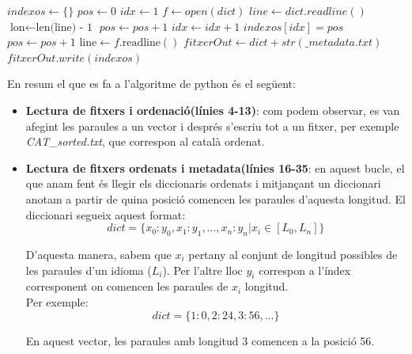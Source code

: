 \documentclass[conference]{IEEEtran}
\begin{document}
\begin{itemize}
\begin{algorithm}
\begin{algorithmic}[1]
                        \State $indexos \gets \{ \}$
                        \State $pos\gets  0$
                        \State $idx \gets 1$
                        \State $f \gets open(dict)$
                        \State $line \gets dict.readline()$
                            \State $\text{lon} \gets \text{len(line) - 1}$
                                \State $pos \gets pos+1$
                            \Else
                                \State $idx \gets idx+1$
                                \State $indexos[idx]=pos$
                                \State $pos \gets pos+1$
                            \EndIf
                            \State $\text{line} \gets f.\text{readline}()$
                        \EndWhile
                        \State $fitxerOut \gets dict+str(\_metadata.txt)$
                        \State $fitxerOut.write(indexos)$
                    \EndFor
                    \end{algorithmic}
                \end{algorithm}

            En resum el que es fa a l'algoritme de python és el següent:

            \begin{itemize}
                \item \textbf{Lectura de fitxers i ordenació(línies 4-13)}: com podem observar, es van afegint les paraules a un vector i després s'escriu tot a un fitxer, per exemple \textit{CAT\_sorted.txt}, que correspon al català ordenat.\\
                \item \textbf{Lectura de fitxers ordenats i metadata(línies 16-35}: en aquest bucle, el que anam fent és llegir els diccionaris ordenats i mitjançant un diccionari anotam a partir de quina posició comencen les paraules d'aquesta longitud. El diccionari segueix aquest format:
                $$dict=\{x_{0}:y_{0},x_{1}:y_{1},...,x_{n}:y_{n}|x_i \in [L_0,L_n]\}$$

                D'aquesta manera, sabem que $x_i$ pertany al conjunt de longitud possibles de les paraules d'un idioma ($L_i$). Per l'altre lloc $y_i$ correspon a l'índex corresponent on comencen les paraules de $x_i$ longitud.\\ Per exemple: \\

                $$dict=\{1:0,2:24,3:56,...\}$$

                En aquest vector, les paraules amb longitud 3 comencen a la posició 56.
            \end{itemize}

        \end{itemize}
\end{document}
